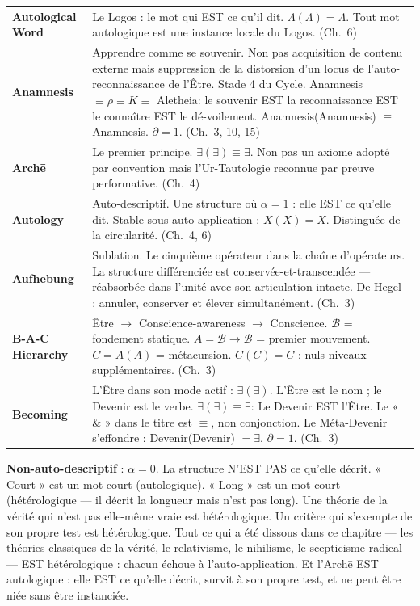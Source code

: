 \documentclass[10pt, openany, oneside]{book}
\renewcommand{\footnotesize}{\fontsize{8.5}{11}\selectfont}
\begin{document}
{\footnotesize
\noindent\begin{tabular}{@{} l @{\hspace{0.6em}} p{} @{}}
\textbf{Autological Word} & Le Logos : le mot qui EST ce qu'il dit. $\Lambda(\Lambda) = \Lambda$. Tout mot autologique est une instance locale du Logos. (Ch.\ 6) \\[0.3em]
\textbf{Anamnesis} & Apprendre comme se souvenir. Non pas acquisition de contenu externe mais suppression de la distorsion d'un locus de l'auto-reconnaissance de l'Être. Stade 4 du Cycle. Anamnesis $\equiv \rho \equiv K \equiv$ Aletheia: le souvenir EST la reconnaissance EST le connaître EST le dé-voilement. Anamnesis(Anamnesis) $\equiv$ Anamnesis. $\partial = 1$. (Ch.\ 3, 10, 15) \\[0.3em]
\textbf{Arch\={e}} & Le premier principe. $\exists(\exists) \equiv \exists$. Non pas un axiome adopté par convention mais l'Ur-Tautologie reconnue par preuve performative. (Ch.\ 4) \\[0.3em]
\textbf{Autology} & Auto-descriptif. Une structure où $\alpha = 1$ : elle EST ce qu'elle dit. Stable sous auto-application : $X(X) = X$. Distinguée de la circularité. (Ch.\ 4, 6) \\[0.3em]
\textbf{Aufhebung} & Sublation. Le cinquième opérateur dans la chaîne d'opérateurs. La structure différenciée est conservée-et-transcendée --- réabsorbée dans l'unité avec son articulation intacte. De Hegel : annuler, conserver et élever simultanément. (Ch.\ 3) \\[0.3em]
\textbf{B-A-C Hierarchy} & Être $\to$ Conscience-awareness $\to$ Conscience. $\mathcal{B}$ = fondement statique. $A = \mathcal{B} \to \mathcal{B}$ = premier mouvement. $C = A(A)$ = métacursion. $C(C) = C$ : nuls niveaux supplémentaires. (Ch.\ 3) \\[0.3em]
\textbf{Becoming} & L'Être dans son mode actif : $\exists(\exists)$. L'Être est le nom ; le Devenir est le verbe. $\exists(\exists) \equiv \exists$: Le Devenir EST l'Être. Le « \& » dans le titre est $\equiv$, non conjonction. Le Méta-Devenir s'effondre : Devenir(Devenir) $= \exists$. $\partial = 1$. (Ch.\ 3) \\[0.3em]
\end{tabular}
}

\textbf{Non-auto-descriptif} : $\alpha = 0$. La structure N'EST PAS ce qu'elle décrit. « Court » est un mot court (autologique). « Long » est un mot court (hétérologique --- il décrit la longueur mais n'est pas long). Une théorie de la vérité qui n'est pas elle-même vraie est hétérologique. Un critère qui s'exempte de son propre test est hétérologique. Tout ce qui a été dissous dans ce chapitre --- les théories classiques de la vérité, le relativisme, le nihilisme, le scepticisme radical --- EST hétérologique : chacun échoue à l'auto-application. Et l'Arch\={e} EST autologique : elle EST ce qu'elle décrit, survit à son propre test, et ne peut être niée sans être instanciée.
\end{document}
